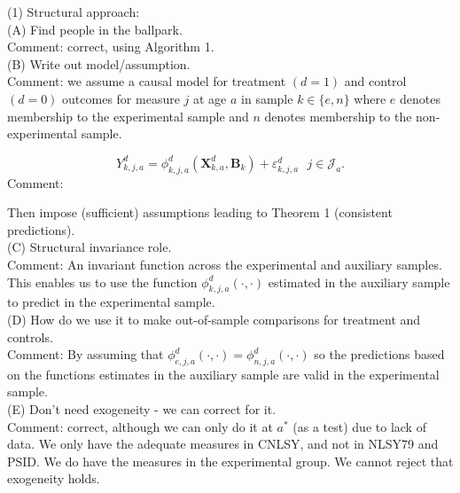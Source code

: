 



\doublespacing


\noindent (1) Structural approach:\\

\noindent (A) Find people in the ballpark.\\
\noindent Comment: correct, using Algorithm 1.\\

\noindent (B) Write out model/assumption.\\
\noindent  Comment: we assume a causal model for treatment $(d = 1)$ and control $(d = 0)$ outcomes for measure $j$ at age $a$ in sample $k \in \{ e, n \}$ where $e$ denotes membership to the experimental sample and $n$ denotes membership to the non-experimental sample.

\begin{equation}
Y_{k,j,a}^d = \phi_{k,j,a}^d \left( \bm{X}_{k,a}^d, \bm{B}_{k} \right) + \varepsilon_{k,j,a}^d \ \ \ j \in \mathcal{J}_{a}.
\end{equation}Comment: 

\noindent Then impose (sufficient) assumptions leading to Theorem 1 (consistent predictions).\\

\noindent (C) Structural invariance role.\\
\noindent Comment: An invariant function across the experimental and auxiliary samples. This enables us to use the function $\phi_{k,j,a}^d \left( \cdot, \cdot \right)$ estimated in the auxiliary sample to predict in the experimental sample.\\

\noindent (D) How do we use it to make out-of-sample comparisons for treatment and controls.\\
\noindent Comment: By assuming that $\phi_{e,j,a}^d \left( \cdot, \cdot \right) = \phi_{n,j,a}^d \left( \cdot, \cdot \right)$ so the predictions based on the functions estimates in the auxiliary sample are valid in the experimental sample.\\

\noindent (E) Don't need exogeneity - we can correct for it.\\ 
\noindent Comment: correct, although we can only do it at $a^*$ (as a test) due to lack of data. We only have the adequate measures in CNLSY, and not in NLSY79 and PSID. We do have the measures in the experimental group. We cannot reject that exogeneity holds.\\

